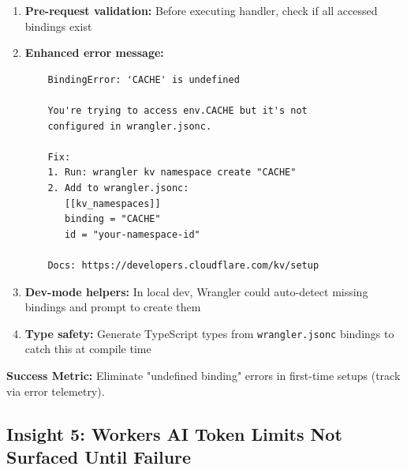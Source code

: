 \documentclass[11pt,a4paper]{article}
\begin{document}
\begin{enumerate}[leftmargin=*, itemsep=0.5em]
    \item \textbf{Pre-request validation:} Before executing handler, check if all accessed bindings exist
    
    \item \textbf{Enhanced error message:}
    \begin{verbatim}
    BindingError: 'CACHE' is undefined
    
    You're trying to access env.CACHE but it's not 
    configured in wrangler.jsonc.
    
    Fix:
    1. Run: wrangler kv namespace create "CACHE"
    2. Add to wrangler.jsonc:
       [[kv_namespaces]]
       binding = "CACHE"
       id = "your-namespace-id"
    
    Docs: https://developers.cloudflare.com/kv/setup
    \end{verbatim}
    
    \item \textbf{Dev-mode helpers:} In local dev, Wrangler could auto-detect missing bindings and prompt to create them
    
    \item \textbf{Type safety:} Generate TypeScript types from \texttt{wrangler.jsonc} bindings to catch this at compile time
\end{enumerate}

\textbf{Success Metric:} Eliminate "undefined binding" errors in first-time setups (track via error telemetry).

\newpage

\subsection{Insight 5: Workers AI Token Limits Not Surfaced Until Failure}
\end{document}
